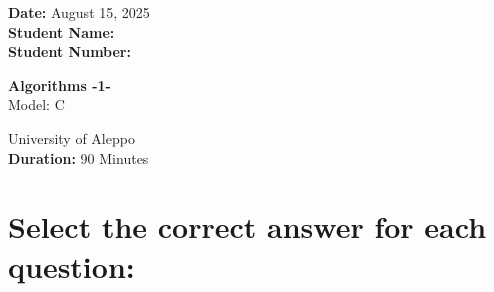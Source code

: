 \documentclass[12pt]{article}
\begin{document}
\begin{minipage}[t]{0.3\textwidth}
    \textbf{Date:} August 15, 2025\\[0.5em]
    \textbf{Student Name: }\\[0.5em]
    \textbf{Student Number: }
\end{minipage}
\begin{minipage}[t]{0.3\textwidth}
    \centering
    \Large\textbf{Algorithms -1-}\\[0.5em]
    \Large{Model:} C\\[0.5em]
\end{minipage}\hfill
\begin{minipage}[t]{0.3\textwidth}
    \raggedleft
    University of Aleppo\\[0.5em]
    \textbf{Duration: }90 Minutes
\end{minipage}

\vspace{1.5cm}

\section*{\small Select the correct answer for each question:}
\end{document}
